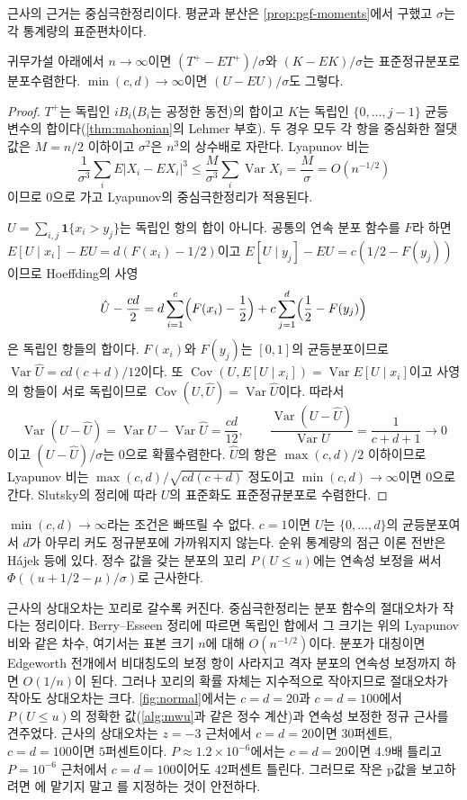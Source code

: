 근사의 근거는 중심극한정리이다. 평균과 분산은 \cref{prop:pgf-moments}에서 구했고 $\sigma$는 각 통계량의 표준편차이다.

\begin{proposition}
\label{prop:rank-clt}
귀무가설 아래에서 $n\to\infty$이면 $(T^+-ET^+)/\sigma$와 $(K-EK)/\sigma$는 표준정규분포로 분포수렴한다. $\min(c,d)\to\infty$이면 $(U-EU)/\sigma$도 그렇다.
\end{proposition}

\begin{proof}
$T^+$는 독립인 $iB_i$($B_i$는 공정한 동전)의 합이고 $K$는 독립인 $\{0,\dots,j-1\}$ 균등 변수의 합이다(\cref{thm:mahonian}의 Lehmer 부호). 두 경우 모두 각 항을 중심화한 절댓값은 $M=n/2$ 이하이고 $\sigma^2$은 $n^3$의 상수배로 자란다. Lyapunov 비는
\[
\frac1{\sigma^3}\sum_iE|X_i-EX_i|^3\le\frac M{\sigma^3}\sum_i\operatorname{Var}X_i=\frac M\sigma=O(n^{-1/2})
\]
이므로 $0$으로 가고 Lyapunov의 중심극한정리가 적용된다.

$U=\sum_{i,j}\mathbf 1\{x_i>y_j\}$는 독립인 항의 합이 아니다. 공통의 연속 분포 함수를 $F$라 하면 $E[U\mid x_i]-EU=d(F(x_i)-1/2)$이고 $E[U\mid y_j]-EU=c(1/2-F(y_j))$이므로 Hoeffding의 사영
\[
\hat U-\frac{cd}2=d\sum_{i=1}^c\Bigl(F(x_i)-\frac12\Bigr)+c\sum_{j=1}^d\Bigl(\frac12-F(y_j)\Bigr)
\]
은 독립인 항들의 합이다. $F(x_i)$와 $F(y_j)$는 $[0,1]$의 균등분포이므로 $\operatorname{Var}\hat U=cd(c+d)/12$이다. 또 $\operatorname{Cov}(U,E[U\mid x_i])=\operatorname{Var}E[U\mid x_i]$이고 사영의 항들이 서로 독립이므로 $\operatorname{Cov}(U,\hat U)=\operatorname{Var}\hat U$이다. 따라서
\[
\operatorname{Var}(U-\hat U)=\operatorname{Var}U-\operatorname{Var}\hat U=\frac{cd}{12},\qquad\frac{\operatorname{Var}(U-\hat U)}{\operatorname{Var}U}=\frac1{c+d+1}\to0
\]
이고 $(U-\hat U)/\sigma$는 $0$으로 확률수렴한다. $\hat U$의 항은 $\max(c,d)/2$ 이하이므로 Lyapunov 비는 $\max(c,d)/\sqrt{cd(c+d)}$ 정도이고 $\min(c,d)\to\infty$이면 $0$으로 간다. Slutsky의 정리에 따라 $U$의 표준화도 표준정규분포로 수렴한다.
\end{proof}

$\min(c,d)\to\infty$라는 조건은 빠뜨릴 수 없다. $c=1$이면 $U$는 $\{0,\dots,d\}$의 균등분포여서 $d$가 아무리 커도 정규분포에 가까워지지 않는다. 순위 통계량의 점근 이론 전반은 H\'ajek 등\cite{hajek1999rank}에 있다. 정수 값을 갖는 분포의 꼬리 $P(U\le u)$에는 연속성 보정을 써서 $\Phi((u+1/2-\mu)/\sigma)$로 근사한다.

근사의 상대오차는 꼬리로 갈수록 커진다. 중심극한정리는 분포 함수의 절대오차가 작다는 정리이다. Berry--Esseen 정리에 따르면 독립인 합에서 그 크기는 위의 Lyapunov 비와 같은 차수, 여기서는 표본 크기 $n$에 대해 $O(n^{-1/2})$이다. 분포가 대칭이면 Edgeworth 전개에서 비대칭도의 보정 항이 사라지고 격자 분포의 연속성 보정까지 하면 $O(1/n)$이 된다\cite{petrov1975}. 그러나 꼬리의 확률 자체는 지수적으로 작아지므로 절대오차가 작아도 상대오차는 크다. \cref{fig:normal}에서는 $c=d=20$과 $c=d=100$에서 $P(U\le u)$의 정확한 값(\cref{alg:mwu}과 같은 정수 계산)과 연속성 보정한 정규 근사를 견주었다. 근사의 상대오차는 $z=-3$ 근처에서 $c=d=20$이면 $30$퍼센트, $c=d=100$이면 $5$퍼센트이다. $P\approx1.2\times10^{-6}$에서는 $c=d=20$이면 $4.9$배 틀리고 $P=10^{-6}$ 근처에서 $c=d=100$이어도 $42$퍼센트 틀린다. 그러므로 작은 p값을 보고하려면 에 맡기지 말고 를 지정하는 것이 안전하다.

